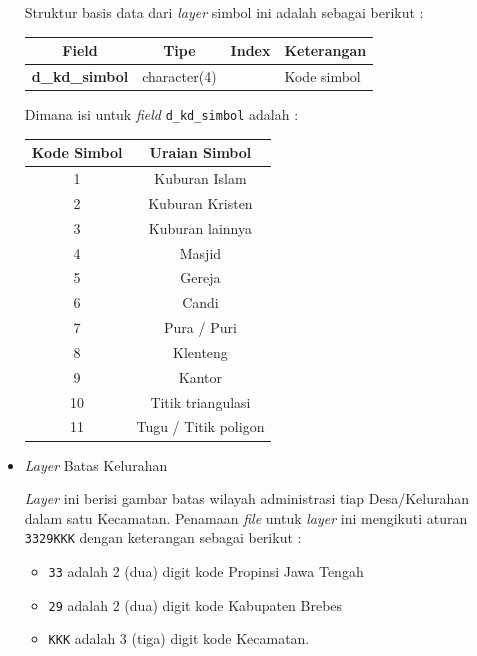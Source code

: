 \begin{itemize}
  Struktur basis data dari \textit{layer} simbol ini adalah sebagai berikut :
  
  \begin{table}[H]
    \centering
    \begin{tabular}{| c | c | c | p{7cm} |}
      \hline
      Field & Tipe & Index & Keterangan \\
      \hline\hline
      \textbf{d\_kd\_simbol} & character(4) & & Kode simbol \\
      \hline
    \end{tabular}
  \end{table}
  
  Dimana isi untuk \textit{field} \texttt{d\_kd\_simbol} adalah :
  
  \begin{table}[H]
    \centering
    \begin{tabular}{| c | c |}
      \hline
      Kode Simbol & Uraian Simbol \\
      \hline\hline
      1 & Kuburan Islam \\
      \hline
      2 & Kuburan Kristen \\
      \hline
      3 & Kuburan lainnya \\
      \hline
      4 & Masjid \\
      \hline
      5 & Gereja \\
      \hline
      6 & Candi \\
      \hline
      7 & Pura / Puri \\
      \hline
      8 & Klenteng \\
      \hline
      9 & Kantor \\
      \hline
      10 & Titik triangulasi \\
      \hline
      11 & Tugu / Titik poligon \\
      \hline
    \end{tabular}
  \end{table}
  
  \item \textit{Layer} Batas Kelurahan
  
  \textit{Layer} ini berisi gambar batas wilayah administrasi tiap Desa/Kelurahan dalam satu Kecamatan. Penamaan \textit{file} untuk \textit{layer} ini mengikuti aturan \texttt{3329KKK} dengan keterangan sebagai berikut :
  
  \begin{itemize}
      \item \texttt{33} adalah 2 (dua) digit kode Propinsi Jawa Tengah
      \item \texttt{29} adalah 2 (dua) digit kode Kabupaten Brebes
      \item \texttt{KKK} adalah 3 (tiga) digit kode Kecamatan.
  \end{itemize}
  

\end{itemize}
